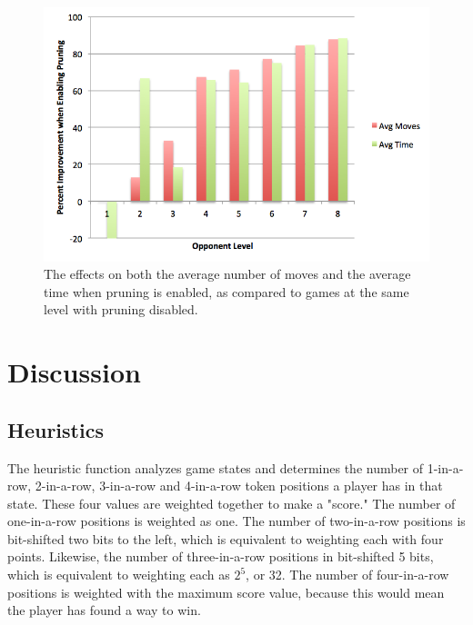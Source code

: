 \documentclass{article}
\begin{document}
\begin{doublespace}
\begin{figure}[ht!]
\centering
\includegraphics[width=6.5in]{../Data/Graphs/Graph1}
\caption{The effects on both the average number of moves and the average time when pruning is enabled, as compared to games at the same level with pruning disabled.}
\end{figure}

\section{Discussion}

\subsection{Heuristics}
The heuristic function analyzes game states and determines the number of 1-in-a-row, 2-in-a-row, 3-in-a-row and 4-in-a-row token positions a player has in that state. These four values are weighted together to make a "score." The number of one-in-a-row positions is weighted as one. The number of two-in-a-row positions is bit-shifted two bits to the left, which is equivalent to weighting each with four points. Likewise, the number of three-in-a-row positions in bit-shifted 5 bits, which is equivalent to weighting each as $2^5$, or 32. The number of four-in-a-row positions is weighted with the maximum score value, because this would mean the player has found a way to win.


\end{doublespace}
\end{document}
